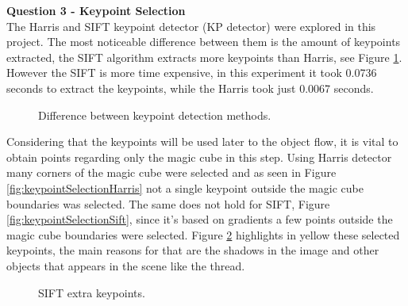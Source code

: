 \documentclass[12pt,a4paper]{article}
\begin{document}
\textbf{\LARGE Question 3 - Keypoint Selection} \\

The Harris and SIFT keypoint detector (KP detector) were explored in this project. The most noticeable difference between them is the amount of keypoints extracted, the SIFT algorithm extracts more keypoints than Harris, see Figure \ref{fig:keypointSelection}. However the SIFT is more time expensive, in this experiment it took 0.0736 seconds to extract the keypoints, while the Harris took just 0.0067 seconds. \\

\begin{figure}[!h]
	\centering
	\quad
	\caption{Difference between keypoint detection methods.}
	\label{fig:keypointSelection}
\end{figure}

Considering that the keypoints will be used later to the object flow, it is vital to obtain points regarding only the magic cube in this step. Using Harris detector many corners of the magic cube were selected and as seen in Figure \ref{fig:keypointSelectionHarris} not a single keypoint outside the magic cube boundaries was selected. The same does not hold for SIFT, Figure \ref{fig:keypointSelectionSift}, since it's based on gradients a few points outside the magic cube boundaries were selected. Figure \ref{fig:keypointSelectionSiftPoints} highlights in yellow  these selected  keypoints, the main reasons for that are the shadows in the image and other objects that appears in the scene like the thread.\\
	
\begin{figure}[!h]
	\centering
	{
		\setlength{\fboxsep}{1pt}
		\setlength{\fboxrule}{1pt}
	}
	\caption{SIFT extra keypoints.}
	\label{fig:keypointSelectionSiftPoints}
\end{figure}
\end{document}
